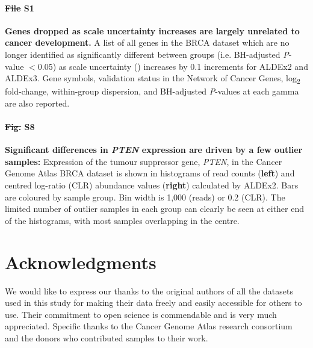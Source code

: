\documentclass[10pt,letterpaper]{article}
\providecommand{\DIFaddtex}[1]{{\protect\color{blue}\uwave{#1}}} %
\providecommand{\DIFdeltex}[1]{{\protect\color{red}\sout{#1}}}                      %
\providecommand{\DIFaddbegin}{} %
\providecommand{\DIFaddend}{} %
\providecommand{\DIFdelbegin}{} %
\providecommand{\DIFdelend}{} %
\providecommand{\DIFadd}[1]{\texorpdfstring{\DIFaddtex{#1}}{#1}} %
\providecommand{\DIFdel}[1]{\texorpdfstring{\DIFdeltex{#1}}{}} %
\newcommand{\DIFscaledelfig}{0.5}
\newlength{\DIFdelgraphicswidth} %
\newlength{\DIFdelgraphicsheight} %
\newcommand{\DIFaddincludegraphics}[2][]{{\color{blue}\fbox{\DIFOincludegraphics[#1]{#2}}}} %
\newcommand{\DIFdelincludegraphics}[2][]{%
\sbox{\DIFdelgraphicsbox}{\DIFOincludegraphics[#1]{#2}}%
\settoboxwidth{\DIFdelgraphicswidth}{\DIFdelgraphicsbox} %
\settoboxtotalheight{\DIFdelgraphicsheight}{\DIFdelgraphicsbox} %
\scalebox{\DIFscaledelfig}{%
\parbox[b]{\DIFdelgraphicswidth}{\usebox{\DIFdelgraphicsbox}\\[-\baselineskip] \rule{\DIFdelgraphicswidth}{0em}}\llap{\resizebox{\DIFdelgraphicswidth}{\DIFdelgraphicsheight}{%
\setlength{\unitlength}{\DIFdelgraphicswidth}%
\begin{picture}(1,1)%
\thicklines\linethickness{2pt} %
{\color[rgb]{1,0,0}\put(0,0){\framebox(1,1){}}}%
{\color[rgb]{1,0,0}\put(0,0){\line( 1,1){1}}}%
{\color[rgb]{1,0,0}\put(0,1){\line(1,-1){1}}}%
\end{picture}%
}\hspace*{3pt}}} %
} %
\DeclareRobustCommand{\DIFaddbegin}{\DIFOaddbegin \let\includegraphics\DIFaddincludegraphics} %
\DeclareRobustCommand{\DIFaddend}{\DIFOaddend \let\includegraphics\DIFOincludegraphics} %
\DeclareRobustCommand{\DIFdelbegin}{\DIFOdelbegin \let\includegraphics\DIFdelincludegraphics} %
\DeclareRobustCommand{\DIFdelend}{\DIFOaddend \let\includegraphics\DIFOincludegraphics} %
\begin{document}
\paragraph*{\DIFdelbegin \DIFdel{File }\DIFdelend S1 \DIFaddbegin \DIFadd{File}\DIFaddend }
\label{file:supFileDroppedGenes}
\textbf{Genes dropped as scale uncertainty increases are largely unrelated to cancer development.} A list of all genes in the BRCA dataset which are no longer identified as significantly different between groups (i.e. BH-adjusted \textit{P}-value $<$0.05) as scale uncertainty (\textgamma) increases by 0.1 increments for ALDEx2 and ALDEx3. Gene symbols, validation status in the Network of Cancer Genes, log\textsubscript{2} fold-change, within-group dispersion, and BH-adjusted \textit{P}-values at each gamma are also reported.

\paragraph*{\DIFdelbegin \DIFdel{Fig. }\DIFdelend S8 \DIFaddbegin \DIFadd{Fig}\DIFaddend }
\label{fig:supFigPTEN}
\textbf{Significant differences in \textit{PTEN} expression are driven by a few outlier samples:} Expression of the tumour suppressor gene, \textit{PTEN}, in the Cancer Genome Atlas BRCA dataset is shown in histograms of read counts (\textbf{left}) and centred log-ratio (CLR) abundance values (\textbf{right}) calculated by ALDEx2. Bars are coloured by sample group. Bin width is 1,000 (reads) or 0.2 (CLR). The limited number of outlier samples in each group can clearly be seen at either end of the histograms, with most samples overlapping in the centre.



\section*{Acknowledgments}
We would like to express our thanks to the original authors of all the datasets used in this study for making their data freely and easily accessible for others to use. Their commitment to open science is commendable and is very much appreciated. Specific thanks to the Cancer Genome Atlas research consortium and the donors who contributed samples to their work.

\nolinenumbers

%
%


\end{document}
